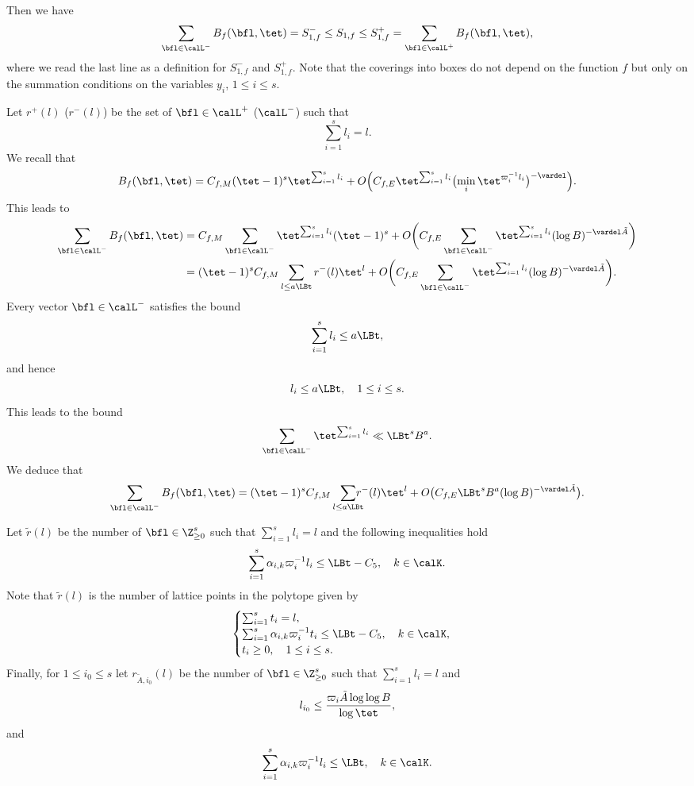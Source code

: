 Then we have
\[
\sum_{\bfl\in \calL^-}B_f(\bfl,\tet) = S_{1,f}^{-}\leq S_{1,f}\leq S_{1,f}^+ = \sum_{\bfl \in \calL^+}B_f(\bfl,\tet),
\]
where we read the last line as a definition for $S_{1,f}^-$ and $S_{1,f}^+$.
Note that the coverings into boxes do not depend on the function $f$ but only on the summation conditions on the variables $y_i$, $1\leq i\leq s$.\par
Let $r^+(l)$ (\resp $r^-(l)$) be the set of $\bfl\in \calL^+$ (\resp $\calL^-$) such that
\[
\sum_{i=1}^s l_i=l.
\]
We recall that
\begin{gather*}
B_f(\bfl,\tet)= C_{f,M} (\tet-1)^s \tet^{\sum_{i=1}^s l_i}+O\Bigl(C_{f,E} \tet^{\sum_{i=1}^s l_i} \bigl(\min_i \tet^{\varpi_i^{-1}l_i}\bigr)^{-\vardel}\Bigr).
\end{gather*}
This leads to
\begin{align*}
\sum_{\bfl\in \calL^-}B_f(\bfl,\tet)&=C_{f,M} \sum_{\bfl\in \calL^-} \tet^{\sum_{i=1}^s l_i} (\tet-1)^s
+O\biggl(C_{f,E} \sum_{\bfl\in \calL^-}\tet^{\sum_{i=1}^s l_i} (\log B)^{-\vardel \tilde{A}}\biggr)
\\
&= (\tet -1)^s C_{f,M} \sum_{l\leq a \LBt} r^-(l) \tet^l
+O\biggl(C_{f,E} \sum_{\bfl\in \calL^-}\tet^{\sum_{i=1}^s l_i} (\log B)^{-\vardel \tilde{A}}\biggr).
\end{align*}
Every vector $\bfl\in \calL^-$ satisfies the bound
\[
\sum_{i=1}^s l_i \leq a \LBt,
\]
and hence
\[
l_i \leq a \LBt, \quad 1\leq i\leq s.
\]
This leads to the bound
\[
\sum_{\bfl\in \calL^-}\tet^{\sum_{i=1}^s l_i}\ll \LBt^s B^{a}.
\]
We deduce that
\[
\sum_{\bfl\in \calL^-}B_f(\bfl,\tet)=(\tet -1)^s C_{f,M} \sum_{l\leq a \LBt}\hspace*{-3mm} r^-(l) \tet^l 
+O\bigl(C_{f,E} \LBt^s B^{a} (\log B)^{-\vardel \tilde{A}}\bigr).
\]

Let $\tilde{r}(l)$ be the number of $\bfl\in \Z_{\geq 0}^s$ such that $\sum_{i=1}^s l_i=l$ and the following inequalities hold
\begin{gather*}
\sum_{i=1}^s \alpha_{i,k} \varpi_i^{-1}l_i \leq \LBt- C_5 ,\quad k\in \calK.
\end{gather*}
Note that $\tilde{r}(l)$ is the number of lattice points in the polytope given by
\[
\begin{cases}
\sum_{i=1}^s t_i=l,\\
\sum_{i=1}^s \alpha_{i,k} \varpi_i^{-1}t_i \leq \LBt - C_5,\quad k\in \calK,\\
t_i\geq 0,\quad 1\leq i\leq s.
\end{cases}
\]
Finally, for $1\leq i_0\leq s$ let $r_{\tilde{A}, i_0}(l)$ be the number of $\bfl\in \Z_{\geq 0}^s$ such that $\sum_{i=1}^s l_i=l$ and
\[
l_{i_0} \leq \frac{\varpi_i \tilde{A} \log \log B}{\log \tet},
\]
and
\begin{gather*}
\sum_{i=1}^s \alpha_{i,k} \varpi_i^{-1}l_i \leq \LBt,\quad k\in \calK.
\end{gather*}

